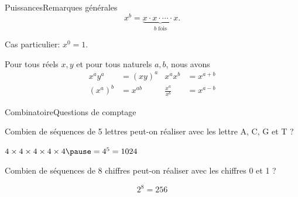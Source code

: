 \begin{frame}{Puissances}{Remarques générales}
  \begin{equation*}
    x^{b} = \underbrace{x \cdot x \cdot \cdots \cdot x}_{b\text{ fois}}.
  \end{equation*}

  Cas particulier: \(x^{0} = 1\).\pause

  \begin{property}Pour tous réels \(x,y\) et pour tous naturels \(a,b\), nous avons
    \begin{align}
      x^{a} y^{a} &= (xy)^{a}  & x^{a} x^{b} &= x^{a+b}\\
      (x^{a})^{b} &= x^{ab} & \frac{x^{a}}{x^{b}} &= x^{a-b}
    \end{align}
  \end{property}
\end{frame}
\begin{frame}{Combinatoire}{Questions de comptage}
  \begin{question}
    Combien de séquences de 5 lettres peut-on réaliser avec les lettre A, C, G et T ?%
  \end{question}
  \begin{answer}%
    \begin{center}
    \begin{math}
      4 \times 4 \times 4 \times 4 \times 4 \pause = 4^5 = 1024
    \end{math}
  \end{center}
  \end{answer}\pause

  \begin{question}
    Combien de séquences de 8 chiffres peut-on réaliser avec les chiffres 0 et 1 ?
  \end{question}
  \begin{answer}\pause
    \begin{equation*}
      2^8 = 256
    \end{equation*}
  \end{answer}
\end{frame}
